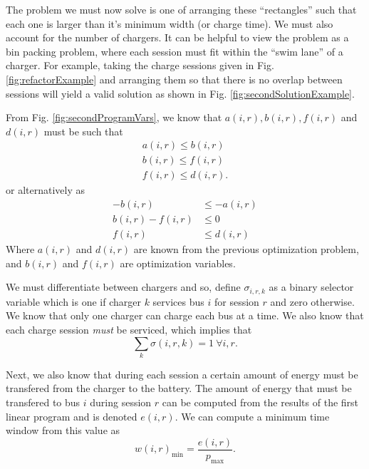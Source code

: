 \par The problem we must now solve is one of arranging these ``rectangles'' such that each one is larger than it's minimum width (or charge time).  We must also account for the number of chargers. It can be helpful to view the problem as a bin packing problem, where each session must fit within the ``swim lane'' of a charger.  For example, taking the charge sessions given in Fig. \ref{fig:refactorExample} and arranging them so that there is no overlap between sessions will yield a valid solution as shown in Fig. \ref{fig:secondSolutionExample}.
\par From Fig. \ref{fig:secondProgramVars}, we know that $a(i,r), b(i,r),f(i,r)$ and $d(i,r)$ must be such that 
\begin{equation*}\begin{aligned}
	a(i,r) \le b(i,r) \\
	b(i,r) \le f(i,r) \\
	f(i,r) \le d(i,r). 	
\end{aligned}\end{equation*}
or alternatively as
\begin{equation} \begin{aligned}
	-b(i,r) &\le -a(i,r) \\
	b(i,r) - f(i,r) &\le 0 \\
	f(i,r) &\le d(i,r)
\end{aligned} \end{equation}
Where $a(i,r)$ and $d(i,r)$ are known from the previous optimization problem, and $b(i,r)$ and $f(i,r)$ are optimization variables. 
\par We must differentiate between chargers and so, define $\sigma_{i,r,k}$ as a binary selector variable which is one if charger $k$ services bus $i$ for session $r$ and zero otherwise. We know that only one charger can charge each bus at a time. We also know that each charge session {\it must} be serviced, which implies that
\begin{equation}
	\sum_k \sigma(i,r,k) = 1  \ \forall i,r.
\end{equation}
\par Next, we also know that during each session a certain amount of energy must be transfered from the charger to the battery.  The amount of energy that must be transfered to bus $i$ during session $r$ can be computed from the results of the first linear program and is denoted $e(i,r)$. We can compute a minimum time window from this value as 
\begin{equation*}
	w(i,r)_{\text{min}} = \frac{e(i,r)}{p_\text{max}}.
\end{equation*}
